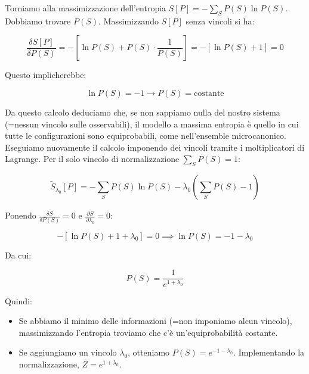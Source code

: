 Torniamo alla massimizzazione dell'entropia $S[P] = -\sum_S P(S) \ln P(S)$.
Dobbiamo trovare $P(S)$. Massimizzando $S[P]$ senza vincoli si ha:

\begin{equation} \label{eq:ch22_16}
\frac{\delta S[P]}{\delta P(S)} = -\left[\ln P(S) + P(S) \cdot \frac{1}{P(S)}\right] = -[\ln P(S) + 1] = 0
\end{equation}

Questo implicherebbe:

\begin{equation} \label{eq:ch22_17}
\ln P(S) = -1 \rightarrow P(S) = \text{costante}  
\end{equation}

Da questo calcolo deduciamo che, se non sappiamo nulla del nostro sistema (=nessun vincolo sulle osservabili), il modello a massima entropia è quello in cui tutte le configurazioni sono equiprobabili, come nell'ensemble microcanonico.
Eseguiamo nuovamente il calcolo imponendo dei vincoli tramite i moltiplicatori di Lagrange.
Per il solo vincolo di normalizzazione $\sum_S P(S) = 1$:

\begin{equation} \label{eq:ch22_18}
\tilde{S}_{\lambda_0 }[P] = -\sum_S P(S) \ln P(S) - \lambda_0 \left(\sum_S P(S) - 1\right)
\end{equation}

Ponendo $\frac{\delta \tilde{S}}{\delta P(S)}= 0$ e $\frac{\partial \tilde{S}}{\partial \lambda_0} = 0$:

\begin{equation} \label{eq:ch22_19}
-[\ln P(S) + 1 + \lambda_0] = 0 \implies \ln P(S) = -1 - \lambda_0
\end{equation}

Da cui:

\begin{equation} \label{eq:ch22_20}
P(S) = \frac{1}{e^{1+\lambda_0}}
\end{equation}

Quindi:
\begin{itemize}
    \item Se abbiamo il minimo delle informazioni (=non imponiamo alcun vincolo), massimizzando l'entropia troviamo che c'è un'equiprobabilità costante.
    \item Se aggiungiamo un vincolo $\lambda_0$, otteniamo $P(S) = e^{-1-\lambda_0}$. Implementando la normalizzazione, $Z = e^{1+\lambda_0}$.
\end{itemize}

